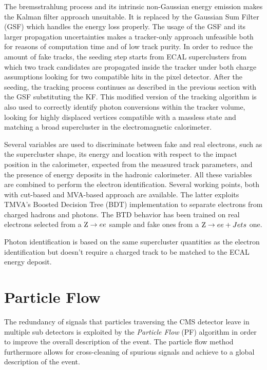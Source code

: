 The bremsstrahlung process and its intrinsic non-Gaussian energy emission makes the Kalman filter approach unsuitable. It is replaced by the Gaussian Sum Filter (GSF) \cite{gsf} which handles the energy loss properly. The usage of the GSF and its larger propagation uncertainties makes a tracker-only approach unfeasible both for reasons of computation time and of low track purity. In order to reduce the amount of fake tracks, the seeding step starts from ECAL superclusters from which two track candidates are propagated inside the tracker under both charge assumptions looking for two compatible hits in the pixel detector. After the seeding, the tracking process continues as described in the previous section with the GSF substituting the KF. This modified version of the tracking algorithm is also used to correctly identify photon conversions within the tracker volume, looking for highly displaced vertices compatible with a massless state and matching a broad supercluster in the electromagnetic calorimeter.

Several variables are used to discriminate between fake and real electrons, such as the supercluster shape, its energy and location with respect to the impact position in the calorimeter, expected from the measured track parameters, and the presence of energy deposits in the hadronic calorimeter. All these variables are combined to perform the electron identification. Several working points, both with cut-based and MVA-based approach are available. The latter exploits TMVA's \cite{TMVA} Boosted Decision Tree (BDT) implementation to separate electrons from charged hadrons and photons. The BTD behavior has been trained on real electrons selected from a $\mathrm{Z} \rightarrow ee$ sample and fake ones from a $\mathrm{Z} \rightarrow ee + Jets$ one.

Photon identification is based on the same supercluster quantities as the electron identification but doesn't require a charged track to be matched to the ECAL energy deposit.  

\section{Particle Flow}


The redundancy of signals that particles traversing the CMS detector leave in multiple sub detectors is exploited by the \emph{Particle Flow} (PF) algorithm in order to improve the overall description of the event. The particle flow method furthermore allows for cross-cleaning of spurious signals and achieve to a global description of the event.

